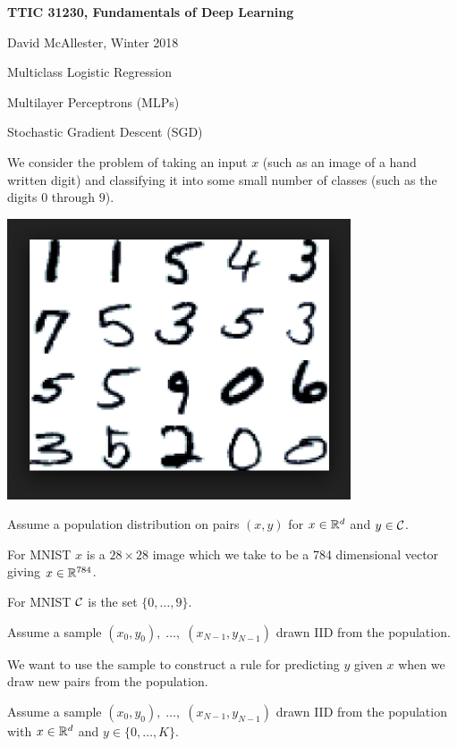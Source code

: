 



{\Huge
  
  \centerline{\bf TTIC 31230, Fundamentals of Deep Learning}
  \bigskip
  \centerline{David McAllester, Winter 2018}
  \vfill
  \vfill
  \centerline{Multiclass Logistic Regression}
  \vfill
  \centerline{Multilayer Perceptrons (MLPs)}
  \vfill
  \centerline{Stochastic Gradient Descent (SGD)}
  \vfill
  \vfill


We consider the problem of taking an input $x$ (such as an image of a hand written digit) and classifying it into some small number of classes (such as the digits $0$ through $9$).

\vfill
\centerline{\includegraphics[width= 4.0in]{../images/MNIST}}
  

Assume a population distribution on pairs $(x,y)$ for $x \in \mathbb{R}^d$ and $y \in {\cal C}$.

\vfill
For MNIST $x$ is a $28 \times 28$ image which we take to be a 784 dimensional vector giving $x \in \mathbb{R}^{784}$.

\vfill
For MNIST ${\cal C}$ is the set $\{0,\ldots,9\}$.

\vfill
Assume a sample $(x_0,y_0),\;\ldots,\;(x_{N-1},y_{N-1})$ drawn IID from the population.

\vfill
We want to use the sample to construct a rule for predicting $y$ given $x$ when we draw new pairs from the population.


Assume a sample $(x_0,y_0),\;\ldots,\;(x_{N-1},y_{N-1})$ drawn IID from the population with $x \in \mathbb{R}^d$ and $y \in \{0,\ldots,K\}$.

}
